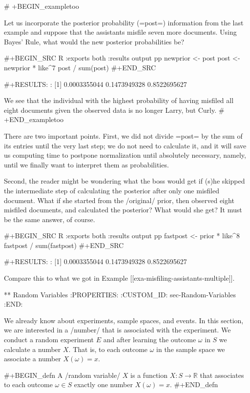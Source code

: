 # +BEGIN_exampletoo

Let us incorporate the posterior probability (=post=) information from
the last example and suppose that the assistants misfile seven more
documents. Using Bayes' Rule, what would the new posterior
probabilities be?

#+BEGIN_SRC R :exports both :results output pp  
newprior <- post
post <- newprior * like^7
post / sum(post)
#+END_SRC

#+RESULTS:
: [1] 0.0003355044 0.1473949328 0.8522695627

We see that the individual with the highest probability of having
misfiled all eight documents given the observed data is no longer
Larry, but Curly.
# +END_exampletoo

There are two important points. First, we did not divide =post= by the
sum of its entries until the very last step; we do not need to
calculate it, and it will save us computing time to postpone
normalization until absolutely necessary, namely, until we finally
want to interpret them as probabilities.

Second, the reader might be wondering what the boss would get if (s)he
skipped the intermediate step of calculating the posterior after only
one misfiled document. What if she started from the /original/ prior,
then observed eight misfiled documents, and calculated the posterior?
What would she get? It must be the same answer, of course.

#+BEGIN_SRC R :exports both :results output pp  
fastpost <- prior * like^8
fastpost / sum(fastpost)
#+END_SRC

#+RESULTS:
: [1] 0.0003355044 0.1473949328 0.8522695627

Compare this to what we got in Example [[exa-misfiling-assistants-multiple]].

** Random Variables
:PROPERTIES:
:CUSTOM_ID: sec-Random-Variables
:END:

We already know about experiments, sample spaces, and events. In this
section, we are interested in a /number/ that is associated with the
experiment. We conduct a random experiment \(E\) and after learning
the outcome \(\omega\) in \(S\) we calculate a number \(X\). That is,
to each outcome \(\omega\) in the sample space we associate a number
\(X(\omega)=x\).

#+BEGIN_defn
A /random variable/ \(X\) is a function \(X:S\to\mathbb{R}\) that
associates to each outcome \(\omega\in S\) exactly one number
\(X(\omega)=x\).
#+END_defn

